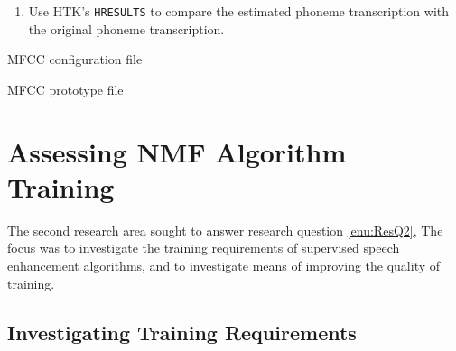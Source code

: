 \begin{algorithm}
\begin{enumerate}
\begin{enumerate}
\item Use \ac{HTK}'s \lstinline[language=bash]!HRESULTS! to compare the
estimated phoneme transcription with the original phoneme transcription.
\end{enumerate}
\end{enumerate}
\protect\caption{\label{alg:ASR}\foreignlanguage{australian}{ \acs{ASR} with \acs{HTK}}%
}
\end{algorithm}


\begin{listing}[H]
\protect\caption{\acl{MFCC} configuration file\label{lst:MFC-config}}



\end{listing}


\begin{listing}[H]
\protect\caption{\acl{MFCC} prototype file\label{lst:MFC-proto}}



\end{listing}



\section{Assessing \acl{NMF} Algorithm Training}

The second research area sought to answer research question \ref{enu:ResQ2},
\textit{\RQtwo{}} The focus was to investigate the training requirements
of supervised speech enhancement algorithms, and to investigate means
of improving the quality of training.


\subsection{\label{sub:Investigating-Training-Req}Investigating Training Requirements}

